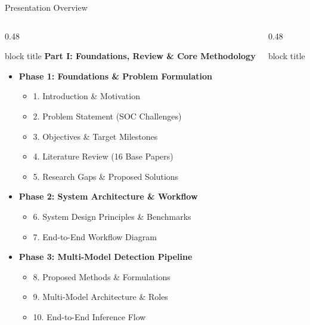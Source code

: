 \documentclass[aspectratio=169,10pt]{beamer}
\begin{document}
\begin{frame}{Presentation Overview}
\vspace{-0.2em}
\begin{columns}[T]
\begin{column}{0.48\textwidth}
\begin{beamercolorbox}[rounded=true,shadow=false,sep=0.35em,wd=\textwidth]{block title}
\textbf{\scriptsize Part I: Foundations, Review \& Core Methodology}
\end{beamercolorbox}
\vspace{0.20em}
{\fontsize{6.5pt}{8.3pt}\selectfont
\begin{itemize}\itemsep0.18em
  \item \textbf{Phase 1: Foundations \& Problem Formulation}
  \begin{itemize}\itemsep0.10em
    \item 1. Introduction \& Motivation
    \item 2. Problem Statement (SOC Challenges)
    \item 3. Objectives \& Target Milestones
    \item 4. Literature Review (16 Base Papers)
    \item 5. Research Gaps \& Proposed Solutions
  \end{itemize}
  \item \textbf{Phase 2: System Architecture \& Workflow}
  \begin{itemize}\itemsep0.10em
    \item 6. System Design Principles \& Benchmarks
    \item 7. End-to-End Workflow Diagram
  \end{itemize}
  \item \textbf{Phase 3: Multi-Model Detection Pipeline}
  \begin{itemize}\itemsep0.10em
    \item 8. Proposed Methods \& Formulations
    \item 9. Multi-Model Architecture \& Roles
    \item 10. End-to-End Inference Flow
  \end{itemize}
\end{itemize}
}
\end{column}
\begin{column}{0.48\textwidth}
\begin{beamercolorbox}[rounded=true,shadow=false,sep=0.35em,wd=\textwidth]{block title}

\end{beamercolorbox}
\end{column}
\end{columns}
\end{frame}
\end{document}
